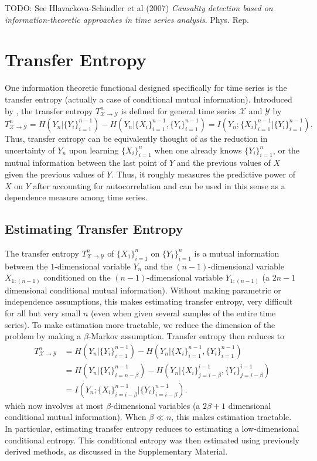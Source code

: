 \documentclass{article} %
\newcommand{\X}{\mathcal{X}}                        %
\newcommand{\Y}{\mathcal{Y}}                        %
\begin{document}
TODO: See Hlavackova-Schindler et al (2007) \emph{Causality detection based
on information-theoretic approaches in time series analysis}. Phys. Rep.

\section{Transfer Entropy}
\label{sec:TE}
One information theoretic functional designed specifically for time series
is the transfer entropy (actually a case of conditional mutual information).
Introduced by \cite{schreiber00transferEntropy}, the transfer entropy
$T_{\X \to \Y}^n$ is defined for general time series $\X$ and $\Y$ by
\[T_{\X \to \Y}^n
    = H(Y_n | \{Y_i\}_{i = 1}^{n - 1}) - H(Y_n | \{X_i\}_{i = 1}^{n - 1}, \{Y_i\}_{i = 1}^{n - 1})
    = I(Y_n; \{X_i\}_{i = 1}^{n - 1} | \{Y_i\}_{i = 1}^{n - 1}).\]
Thus, transfer entropy can be equivalently thought of as the reduction in
uncertainty of $Y_n$ upon learning $\{X_i\}_{i = 1}^n$ when one already knows
$\{Y_i\}_{i = 1}^n$, or the mutual information between the last point of $Y$
and the previous values of $X$ given the previous values of $Y$. Thus, it
roughly measures the predictive power of $X$ on $Y$ after accounting for
autocorrelation and can be used in this sense as a dependence measure among
time series.

\subsection{Estimating Transfer Entropy}
The transfer entropy $T_{\X \to \Y}^n$ of $\{X_1\}_{i = 1}^n$ on
$\{Y_1\}_{i = 1}^n$ is a mutual information between the $1$-dimensional
variable $Y_n$ and the $(n - 1)$-dimensional variable $X_{1:(n - 1)}$
conditioned on the $(n - 1)$-dimensional variable $Y_{1:(n - 1)}$ (a $2n - 1$
dimensional conditional mutual information). Without making parametric or
independence assumptions, this makes estimating transfer entropy, very
difficult for all but very small $n$ (even when given several samples of the
entire time series). To make estimation more tractable, we reduce the dimension
of the problem by making a $\beta$-Markov assumption.
Transfer entropy then reduces to
\begin{align*}
T_{\X \to \Y}^n
 &  = H(Y_n | \{Y_i\}_{i = 1}^{n - 1})
        - H(Y_n | \{X_i\}_{i = 1}^{n - 1}, \{Y_i\}_{i = 1}^{n - 1}) \\
 &  = H(Y_n | \{Y_i\}_{i = n - \beta}^{n - 1})
        - H(Y_n | \{X_i\}_{j = i - \beta}^{i - 1}, \{Y_i\}_{j = i - \beta}^{i - 1}) \\
 &  = I(Y_n; \{X_i\}_{i = i - \beta}^{n - 1}
                                            | \{Y_i\}_{i = i - \beta}^{n - 1}).
\end{align*}
which now involves at most $\beta$-dimensional variables (a $2\beta + 1$
dimensional conditional mutual information). When $\beta \ll n$, this makes
estimation tractable. In particular, estimating transfer entropy reduces to
estimating a low-dimensional conditional entropy. This conditional entropy was
then estimated using previously derived methods, as discussed in the
Supplementary Material.
\end{document}
